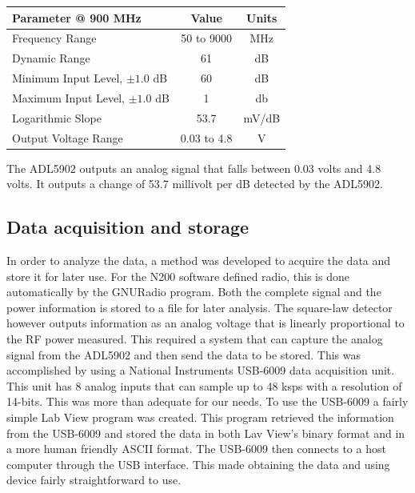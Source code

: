 \begin{table}[h!tb] \centering
{}
\label{ADL5902_data}
\begin{tabular}{lcc} \hline
\textbf{Parameter @ 900 MHz} & \textbf{Value} & \textbf{Units} \\ \hline
Frequency Range & 50 to 9000 & MHz \\
Dynamic Range & 61 & dB \\
Minimum Input Level, $\pm 1.0$ dB & 60 & dB \\ 
Maximum Input Level, $\pm 1.0$ dB & 1 & db \\
Logarithmic Slope & 53.7 & mV/dB \\ 
Output Voltage Range & 0.03 to 4.8 & V \\ \hline
\end{tabular}
\end{table}

The ADL5902 outputs an analog signal that falls between 0.03 volts and 4.8 volts.  It outputs a change of 53.7 millivolt per dB detected by the ADL5902.  

\subsection{Data acquisition and storage}

In order to analyze the data, a method was developed to acquire the data and store it for later use.  For the N200 software defined radio, this is done automatically by the GNURadio program.  Both the complete signal and the power information is stored to a file for later analysis.  The square-law detector however outputs information as an analog voltage that is linearly proportional to the RF power measured.  This required a system that can capture the analog signal from the ADL5902 and then send the data to be stored.  This was accomplished by using a National Instruments USB-6009 data acquisition unit.  This unit has 8 analog inputs that can sample up to 48 ksps with a resolution of 14-bits.  This was more than adequate for our needs.  To use the USB-6009 a fairly simple Lab View program was created.  This program retrieved the information from the USB-6009 and stored the data in both Lav View's binary format and in a more human friendly ASCII format.  The USB-6009 then connects to a host computer through the USB interface.  This made obtaining the data and using device fairly straightforward to use.

